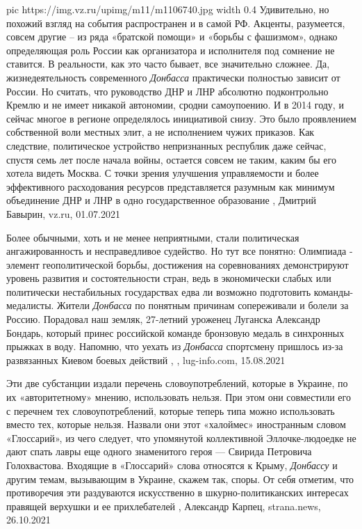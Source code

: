 \ifcmt
  pic https://img.vz.ru/upimg/m11/m1106740.jpg
  width 0.4
\fi
Удивительно, но похожий взгляд на события распространен и в самой РФ. Акценты,
разумеется, совсем другие – из ряда «братской помощи» и «борьбы с фашизмом»,
однако определяющая роль России как организатора и исполнителя под сомнение не
ставится.  В реальности, как это часто бывает, все значительно сложнее. Да,
жизнедеятельность современного \emph{Донбасса} практически полностью зависит от
России. Но считать, что руководство ДНР и ЛНР абсолютно подконтрольно Кремлю и
не имеет никакой автономии, сродни самоупоению.  И в 2014 году, и сейчас многое
в регионе определялось инициативой снизу. Это было проявлением собственной воли
местных элит, а не исполнением чужих приказов.  Как следствие, политическое
устройство непризнанных республик даже сейчас, спустя семь лет после начала
войны, остается совсем не таким, каким бы его хотела видеть Москва. С точки
зрения улучшения управляемости и более эффективного расходования ресурсов
представляется разумным как минимум объединение ДНР и ЛНР в одно
государственное образование
, Дмитрий Бавырин, vz.ru, 01.07.2021

Более обычными, хоть и не менее неприятными, стали политическая
ангажированность и несправедливое судейство. Но тут все понятно: Олимпиада -
элемент геополитической борьбы, достижения на соревнованиях демонстрируют
уровень развития и состоятельности стран, ведь в экономически слабых или
политически нестабильных государствах едва ли возможно подготовить
команды-медалисты.  Жители \emph{Донбасса} по понятным причинам сопереживали и болели
за Россию. Порадовал наш земляк, 27-летний уроженец Луганска Александр Бондарь,
который принес российской команде бронзовую медаль в синхронных прыжках в воду.
Напомню, что уехать из \emph{Донбасса} спортсмену пришлось из-за развязанных Киевом
боевых действий
, 
, lug-info.com, 15.08.2021

Эти две субстанции издали перечень словоупотреблений, которые в Украине, по их
«авторитетному» мнению, использовать нельзя. При этом они совместили его с
перечнем тех словоупотреблений, которые теперь типа можно использовать вместо
тех, которые нельзя. Назвали они этот «халоймес» иностранным словом
«Глоссарий», из чего следует, что упомянутой коллективной Эллочке-людоедке не
дают спать лавры еще одного знаменитого героя — Свирида Петровича Голохвастова.
Входящие в «Глоссарий» слова относятся к Крыму, \emph{Донбассу} и другим темам,
вызывающим в Украине, скажем так, споры. От себя отметим, что противоречия эти
раздуваются искусственно в шкурно-политиканских интересах правящей верхушки и
ее прихлебателей
, 
Александр Карпец, strana.news, 26.10.2021

